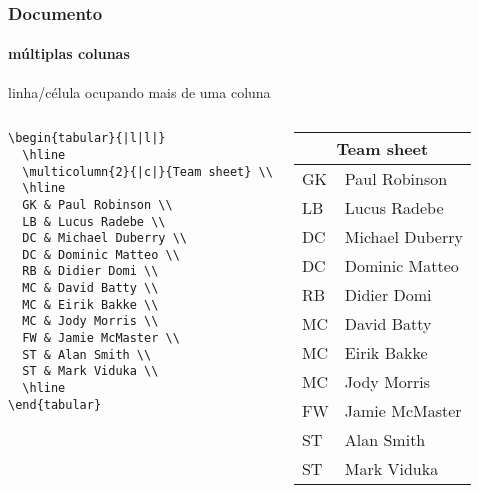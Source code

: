 \begin{frame}[fragile]
\frametitle{Documento}
\framesubtitle{múltiplas colunas}
  \scriptsize 
  linha/célula ocupando mais de uma coluna
  \begin{columns}[c]
  \begin{verbatim}
\begin{tabular}{|l|l|}
  \hline
  \multicolumn{2}{|c|}{Team sheet} \\
  \hline
  GK & Paul Robinson \\
  LB & Lucus Radebe \\
  DC & Michael Duberry \\
  DC & Dominic Matteo \\
  RB & Didier Domi \\
  MC & David Batty \\
  MC & Eirik Bakke \\
  MC & Jody Morris \\
  FW & Jamie McMaster \\
  ST & Alan Smith \\
  ST & Mark Viduka \\
  \hline
\end{tabular}
  \end{verbatim}
  \begin{fmpage}{\textwidth}
\begin{tabular}{|l|l|}
  \hline
  \multicolumn{2}{|c|}{Team sheet} \\
  \hline
  GK & Paul Robinson \\
  LB & Lucus Radebe \\
  DC & Michael Duberry \\
  DC & Dominic Matteo \\
  RB & Didier Domi \\
  MC & David Batty \\
  MC & Eirik Bakke \\
  MC & Jody Morris \\
  FW & Jamie McMaster \\
  ST & Alan Smith \\
  ST & Mark Viduka \\
  \hline
\end{tabular}
  \end{fmpage}
  \end{columns}
\end{frame}


